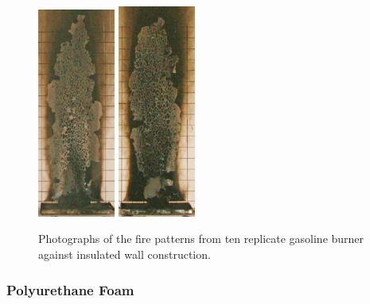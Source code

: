 \documentclass[twoside]{uocthesis}
\begin{document}
\begin{figure}[p]
	\includegraphics[width=1.0in]{../Figures/GBGAS_21_IMG_6006}
	\includegraphics[width=1.0in]{../Figures/GBGAS_22_IMG_6026}	\\

	\caption[Photographs of the fire patterns from ten replicate gasoline burner against insulated wall construction]{Photographs of the fire patterns from ten replicate gasoline burner against insulated wall construction.}
	\label{Gas_Insulated_Wall}
\end{figure}

\subsubsection{Polyurethane Foam}
\end{document}
